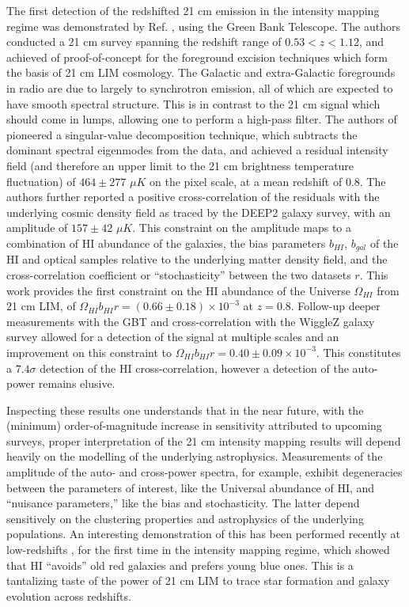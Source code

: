 The first detection of the redshifted 21 cm emission in the intensity mapping regime was demonstrated by Ref. \citep{changetal}, using the Green Bank Telescope. The authors conducted a 21 cm survey spanning the redshift range of $0.53 < z < 1.12$, and achieved of proof-of-concept for the foreground excision techniques which form the basis of 21 cm LIM cosmology. The Galactic and extra-Galactic foregrounds in radio are due to largely to synchrotron emission, all of which are expected to have smooth spectral structure. This is in contrast to the 21 cm signal which should come in lumps, allowing one to perform a high-pass filter. The authors of \citep{changetal} pioneered a singular-value decomposition technique, which subtracts the dominant spectral eigenmodes from the data, and achieved a residual intensity field (and therefore an upper limit to the 21 cm brightness temperature fluctuation) of $464 \pm 277$ $\mu K$ on the pixel scale, at a mean redshift of $0.8$. The authors further reported a positive cross-correlation of the residuals with the underlying cosmic density field as traced by the DEEP2 galaxy survey, with an amplitude of $157 \pm 42$ $\mu K$. This constraint on the amplitude maps to a combination of HI abundance of the galaxies, the bias parameters $b_{HI}$, $b_{gal}$ of the HI and optical samples relative to the underlying matter density field, and the cross-correlation coefficient or ``stochasticity'' between the two datasets $r$. This work provides the first constraint on the HI abundance of the Universe $\Omega_{HI}$ from 21 cm LIM, of $\Omega_{HI}b_{HI}r = (0.66 \pm 0.18) \times 10^{-3}$ at $z = 0.8$. Follow-up deeper measurements with the GBT \citep{masuietalgbt} and cross-correlation with the WiggleZ galaxy survey \citep{switzeretalgbt} allowed for a detection of the signal at multiple scales and an improvement on this constraint to $\Omega_{HI}b_{HI}r=0.40 \pm 0.09 \times 10^{-3}$. This constitutes a $7.4\sigma$ detection of the HI cross-correlation, however a detection of the auto-power remains elusive.

Inspecting these results one understands that in the near future, with the (minimum) order-of-magnitude increase in sensitivity attributed to upcoming surveys,  proper interpretation of the 21 cm intensity mapping results will depend heavily on the modelling of the underlying astrophysics. Measurements of the amplitude of the auto- and cross-power spectra, for example, exhibit degeneracies between the parameters of interest, like the Universal abundance of HI, and ``nuisance parameters,'' like the bias and stochasticity. The latter depend sensitively on the clustering properties and astrophysics of the underlying populations. An interesting demonstration of this has been performed recently at low-redshifts \citep{andersonetalparkes}, for the first time in the intensity mapping regime, which showed that HI ``avoids'' old red galaxies and prefers young blue ones. This is a tantalizing taste of the power of 21 cm LIM to trace star formation and galaxy evolution across redshifts. 

